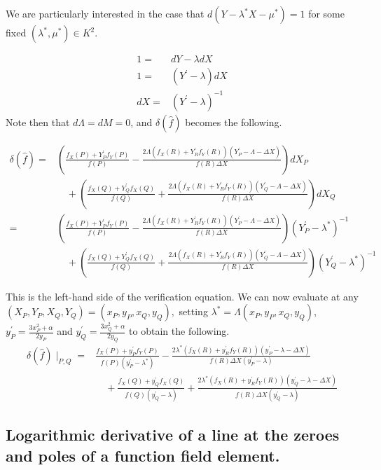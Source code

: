 \documentclass[11pt,letterpaper]{article}
\theoremstyle{definition}
\newcommand{\6}{\mathbf}
\newcommand{\7}{\mathcal}
\begin{document}
We are particularly interested in the case that $d(Y-\lambda^* X - \mu^*) = 1$ for some fixed $(\lambda^*, \mu^*) \in K^2$.

\begin{align}
1 =& dY - \lambda dX  \\
1 =& (Y^\prime - \lambda) dX \\
dX =& (Y^\prime - \lambda)^{-1}
\end{align}
Note then that $d\Lambda = dM = 0$, and $\delta(\widehat{f})$ becomes the following.

\begin{align}
\delta(\widehat{f}) =& \left(\frac{f_X(P) + Y_P^\prime f_Y(P)}{f(P)}- \frac{2\Lambda(f_X(R) + Y_R^\prime f_Y(R))(Y_P^\prime - \Lambda - \Delta X)}{f(R)\Delta X}\right)dX_P \\&  \quad + \left(\frac{f_X(Q) + Y_Q^\prime f_X(Q)}{f(Q)} + \frac{2\Lambda(f_X(R) + Y_R^\prime f_Y(R))(Y_Q^\prime - \Lambda - \Delta X)}{f(R) \Delta X}\right)dX_Q \\
=& \left(\frac{f_X(P) + Y_P^\prime f_Y(P)}{f(P)}- \frac{2\Lambda(f_X(R) + Y_R^\prime f_Y(R))(Y_P^\prime - \Lambda - \Delta X)}{f(R)\Delta X}\right)(Y_P^\prime - \lambda^*)^{-1} \\&  \quad + \left(\frac{f_X(Q) + Y_Q^\prime f_X(Q)}{f(Q)} + \frac{2\Lambda(f_X(R) + Y_R^\prime f_Y(R))(Y_Q^\prime - \Lambda - \Delta X)}{f(R) \Delta X}\right)(Y_Q^\prime - \lambda^*)^{-1}
\end{align}

This is the left-hand side of the verification equation. We can now evaluate at any \\
$(X_P, Y_P, X_Q, Y_Q) = (x_P, y_P, x_Q, y_Q),$ 
setting $\lambda^* = \Lambda(x_P,y_P, x_Q, y_Q)$, $y_P^\prime = \frac{3x_P^2+\alpha}{2y_P}$ and  $y_Q^\prime = \frac{3x_Q^2+\alpha}{2y_Q}$ to obtain the following.
\begin{align}
\delta(\widehat{f})\mid_{P,Q} =& 
\frac{f_X(P) + y_P^\prime f_Y(P)}{f(P)(y_P^\prime - \lambda^*)}- 
\frac{2\lambda^*(f_X(R) + y_R^\prime f_Y(R))(y_P^\prime - \lambda - \Delta X)}{f(R)\Delta X(y_P^\prime - \lambda)}  \\
&  \quad + \frac{f_X(Q) + y_Q^\prime f_X(Q)}{f(Q)(y_Q^\prime - \lambda)} + 
\frac{2\lambda^*(f_X(R) + y_R^\prime f_Y(R))(y_Q^\prime - \lambda - \Delta X)}{f(R) \Delta X(y_Q^\prime - \lambda)} \label{deltafhat}
\end{align}

\subsection{Logarithmic derivative of a line at the zeroes and poles of a function field element.}
\end{document}
